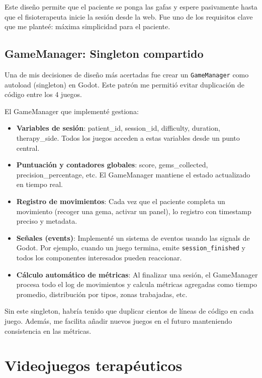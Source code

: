Este diseño permite que el paciente se ponga las gafas y espere pasivamente hasta que el fisioterapeuta inicie la sesión desde la web. Fue uno de los requisitos clave que me planteé: máxima simplicidad para el paciente.

\subsection{GameManager: Singleton compartido}

Una de mis decisiones de diseño más acertadas fue crear un \texttt{GameManager} como autoload (singleton) en Godot. Este patrón me permitió evitar duplicación de código entre los 4 juegos.

El GameManager que implementé gestiona:

\begin{itemize}
    \item \textbf{Variables de sesión}: patient\_id, session\_id, difficulty, duration, therapy\_side. Todos los juegos acceden a estas variables desde un punto central.
    
    \item \textbf{Puntuación y contadores globales}: score, gems\_collected, precision\_percentage, etc. El GameManager mantiene el estado actualizado en tiempo real.
    
    \item \textbf{Registro de movimientos}: Cada vez que el paciente completa un movimiento (recoger una gema, activar un panel), lo registro con timestamp preciso y metadata.
    
    \item \textbf{Señales (events)}: Implementé un sistema de eventos usando las signals de Godot. Por ejemplo, cuando un juego termina, emite \texttt{session\_finished} y todos los componentes interesados pueden reaccionar.
    
    \item \textbf{Cálculo automático de métricas}: Al finalizar una sesión, el GameManager procesa todo el log de movimientos y calcula métricas agregadas como tiempo promedio, distribución por tipos, zonas trabajadas, etc.
\end{itemize}

Sin este singleton, habría tenido que duplicar cientos de líneas de código en cada juego. Además, me facilita añadir nuevos juegos en el futuro manteniendo consistencia en las métricas.

\section{Videojuegos terapéuticos}

